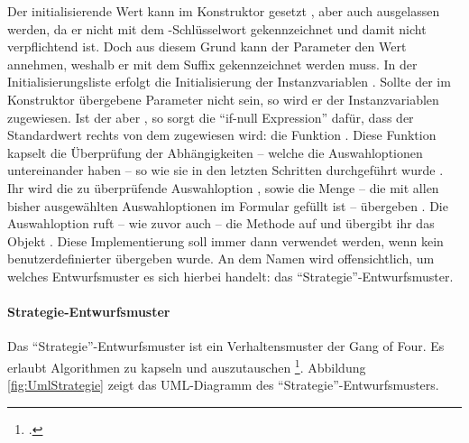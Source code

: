 Der initialisierende Wert kann im Konstruktor gesetzt ,
aber auch ausgelassen werden,
da er nicht mit dem -Schlüsselwort gekennzeichnet und damit nicht verpflichtend ist.
Doch aus diesem Grund kann der Parameter den Wert  annehmen,
weshalb er mit dem Suffix  gekennzeichnet werden muss.
In der Initialisierungsliste erfolgt die Initialisierung der Instanzvariablen  .
Sollte der im Konstruktor übergebene Parameter nicht  sein,
so wird er der Instanzvariablen zugewiesen.
Ist der aber ,
so sorgt die \enquote{if-null Expression} dafür,
dass der Standardwert rechts von dem  zugewiesen wird:
die Funktion  .
Diese Funktion kapselt die Überprüfung der Abhängigkeiten
-- welche die Auswahloptionen  untereinander haben --
so wie sie in den letzten Schritten durchgeführt wurde .
Ihr wird die zu überprüfende Auswahloption ,
sowie die Menge  -- die mit allen bisher ausgewählten Auswahloptionen im Formular gefüllt ist --
übergeben .
Die Auswahloption  ruft
-- wie zuvor auch --
die Methode  auf
und übergibt ihr das Objekt  .
Diese Implementierung soll immer dann verwendet werden, 
wenn kein benutzerdefinierter  übergeben wurde.
An dem Namen  wird offensichtlich, um welches Entwurfsmuster es sich hierbei handelt: das \enquote{Strategie}-Entwurfsmuster. 


\paragraph{Strategie-Entwurfsmuster} Das \enquote{Strategie}-Entwurfsmuster ist ein Verhaltensmuster der Gang of Four.
Es erlaubt Algorithmen zu kapseln und auszutauschen \footcite[Vgl.][S. 373]{gamma2009entwurfsmuster}.
Abbildung \ref{fig:UmlStrategie} zeigt das UML-Diagramm des \enquote{Strategie}-Entwurfsmusters. 

